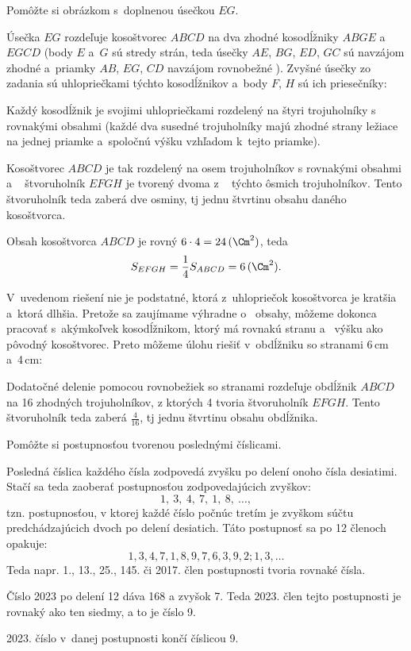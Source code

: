 {%
\napad
Pomôžte si obrázkom s~doplnenou úsečkou $EG$.

\riesenie
Úsečka $EG$ rozdeľuje kosoštvorec $ABCD$ na dva zhodné kosodĺžniky $ABGE$ a~$EGCD$
(body $E$ a~$G$ sú stredy strán, teda úsečky $AE$, $BG$, $ED$, $GC$ sú navzájom zhodné a~priamky $AB$, $EG$, $CD$ navzájom rovnobežné ).
Zvyšné úsečky zo zadania sú uhlopriečkami týchto kosodĺžnikov a~body $F$, $H$ sú ich priesečníky:
%

Každý kosodĺžnik je svojimi uhlopriečkami rozdelený na štyri trojuholníky s rovnakými obsahmi
(každé dva susedné trojuholníky majú zhodné strany ležiace na jednej priamke a~spoločnú výšku vzhľadom k~tejto priamke).

Kosoštvorec $ABCD$ je tak rozdelený na osem trojuholníkov s rovnakými obsahmi a ~ štvoruholník $EFGH$ je tvorený dvoma z ~ týchto ôsmich trojuholníkov.
Tento štvoruholník teda zaberá dve osminy, tj jednu štvrtinu obsahu daného kosoštvorca.

Obsah kosoštvorca $ABCD$ je rovný $6\cdot4 =24\,(\Cm^2)$, teda
$$
S_{EFGH} = \frac14 S_{ABCD} = 6\,(\Cm^2).
$$

\poznamky
V~uvedenom riešení nie je podstatné, ktorá z~uhlopriečok kosoštvorca je kratšia a~ktorá dlhšia.
Pretože sa zaujímame výhradne o ~obsahy, môžeme dokonca pracovať s~akýmkoľvek kosodĺžnikom, ktorý má rovnakú stranu a ~výšku ako pôvodný kosoštvorec.
Preto môžeme úlohu riešiť v~obdĺžniku so stranami 6\,cm a~4\,cm:
%

Dodatočné delenie pomocou rovnobežiek so stranami rozdeľuje obdĺžnik $ABCD$ na 16 zhodných trojuholníkov, z ktorých 4 tvoria štvoruholník $EFGH$.
Tento štvoruholník teda zaberá $\frac4{16}$, tj jednu štvrtinu obsahu obdĺžnika.}

{%
\napad
Pomôžte si postupnosťou tvorenou poslednými číslicami.

\riesenie
Posledná číslica každého čísla zodpovedá zvyšku po delení onoho čísla desiatimi.
Stačí sa teda zaoberať postupnosťou zodpovedajúcich zvyškov:
$$
1,\ 3,\ 4,\ 7,\ 1,\ 8,\ \dots ,
$$
tzn. postupnosťou, v ktorej každé číslo počnúc tretím je zvyškom súčtu predchádzajúcich dvoch po delení desiatich.
Táto postupnosť sa po 12 členoch opakuje:
$$
1, 3, 4, 7, 1, 8, 9, 7, 6, 3, 9, 2; 1, 3, \dots
$$
Teda napr. 1., 13., 25., 145. či 2017. člen postupnosti tvoria rovnaké čísla.

Číslo 2023 po delení 12 dáva 168 a zvyšok 7.
Teda 2023. člen tejto postupnosti je rovnaký ako ten siedmy, a to je číslo 9.

2023. číslo v~danej postupnosti končí číslicou 9.}


